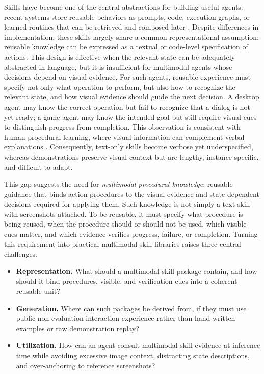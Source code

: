 \documentclass{llmxive}
\begin{document}
Skills have become one of the central abstractions for building useful agents: recent systems store reusable behaviors as prompts, code, execution graphs, or learned routines that can be retrieved and composed later \citep{wang2023voyager,zheng2025skillweaver,chen2026cuaskill,wang2026skillx}. Despite differences in implementation, these skills largely share a common representational assumption: reusable knowledge can be expressed as a textual or code-level specification of actions. This design is effective when the relevant state can be adequately abstracted in language, but it is insufficient for multimodal agents whose decisions depend on visual evidence. For such agents, reusable experience must specify not only what operation to perform, but also how to recognize the relevant state, and how visual evidence should guide the next decision.
A desktop agent may know the correct operation but fail to recognize that a dialog is not yet ready; a game agent may know the intended goal but still require visual cues to distinguish progress from completion.
This observation is consistent with human procedural learning, where visual information can complement verbal explanations \citep{mayer2009multimedia}.
Consequently, text-only skills become verbose yet underspecified, whereas demonstrations preserve visual context but are lengthy, instance-specific, and difficult to adapt.

This gap suggests the need for \emph{multimodal procedural knowledge}: reusable guidance that binds action procedures to the visual evidence and state-dependent decisions required for applying them.
Such knowledge is not simply a text skill with screenshots attached.
To be reusable, it must specify what procedure is being reused, when the procedure should or should not be used, which visible cues matter, and which evidence verifies progress, failure, or completion.
Turning this requirement into practical multimodal skill libraries raises three central challenges:
\begin{itemize}[leftmargin=*]
    \item \textbf{Representation.} What should a multimodal skill package contain, and how should it bind procedures, visible, and verification cues into a coherent reusable unit?
    \item \textbf{Generation.} Where can such packages be derived from, if they must use public non-evaluation interaction experience rather than hand-written examples or raw demonstration replay?
    \item \textbf{Utilization.} How can an agent consult multimodal skill evidence at inference time while avoiding excessive image context, distracting state descriptions, and over-anchoring to reference screenshots?
\end{itemize}
\end{document}
